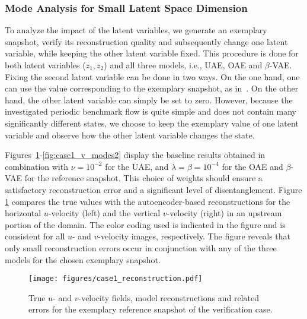 \subsubsection{Mode Analysis for Small Latent Space Dimension}
\label{sec:modean-2Dm2}
To analyze the impact of the latent variables, we generate an exemplary snapshot, verify its reconstruction quality and subsequently change one latent variable, while keeping the other latent variable fixed. This procedure is done for both latent variables ($z_1, z_2$) and all three models, i.e., UAE, OAE and $\beta$-VAE.
%
Fixing the second latent variable can be done in two ways.
On the one hand, one can use the value corresponding to the exemplary snapshot, as in~\cite{Higgins2016betaVAELB, burgess2018understandingdisentanglingbetavae, kang:2022}. On the other hand, the other latent variable can simply be set to zero.
%
However, because the investigated periodic benchmark flow is quite simple and does not contain many significantly different states, we choose to keep the exemplary value of one latent variable and observe how the other latent variable changes the state. 

Figures~\ref{fig:case1_reconstruction}-\ref{fig:case1_v_modes2} display the baseline results obtained in combination with $\nu=10^{-2}$ for the UAE, and $\lambda=\beta=10^{-4}$ for the OAE and $\beta$-VAE for the  reference snapshot.
This choice of weights should ensure a satisfactory reconstruction error and a significant level of disentanglement.
%
 Figure \ref{fig:case1_reconstruction} compares the true values with the 
autoencoder-based reconstructions for the horizontal $u$-velocity (left) 
 and the vertical $v$-velocity (right) in an upstream portion of the domain. 
 The color coding used is indicated in the figure and is consistent for all $u$- and $v$-velocity images, respectively.
The figure reveals that only small reconstruction errors occur in conjunction with any of the three models for the chosen exemplary snapshot. 

\begin{figure}[h!]
    \centering
    \texttt{[image: figures/case1\_reconstruction.pdf]}
    \caption{True $u$- and $v$-velocity fields, model reconstructions and related errors for the exemplary reference snapshot of the verification case.}
    \label{fig:case1_reconstruction}
\end{figure}
 
